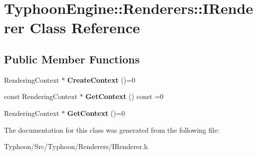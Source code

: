 \hypertarget{class_typhoon_engine_1_1_renderers_1_1_i_renderer}{}\section{Typhoon\+Engine\+::Renderers\+::I\+Renderer Class Reference}
\label{class_typhoon_engine_1_1_renderers_1_1_i_renderer}
\subsection*{Public Member Functions}
\begin{DoxyCompactItemize}
\item 
\mbox{\label{class_typhoon_engine_1_1_renderers_1_1_i_renderer_aabf670f18f7582af9c2e8cf36cfc6073}} 
Rendering\+Context $\ast$ {\bfseries Create\+Context} ()=0
\item 
\mbox{\label{class_typhoon_engine_1_1_renderers_1_1_i_renderer_afebae099acbfe6128a1d858cb15b4f72}} 
const Rendering\+Context $\ast$ {\bfseries Get\+Context} () const =0
\item 
\mbox{\label{class_typhoon_engine_1_1_renderers_1_1_i_renderer_a6bf51d043130fc17be28d4721b74f055}} 
Rendering\+Context $\ast$ {\bfseries Get\+Context} ()=0
\end{DoxyCompactItemize}


The documentation for this class was generated from the following file\+:\begin{DoxyCompactItemize}
\item 
Typhoon/\+Src/\+Typhoon/\+Renderers/I\+Renderer.\+h\end{DoxyCompactItemize}
